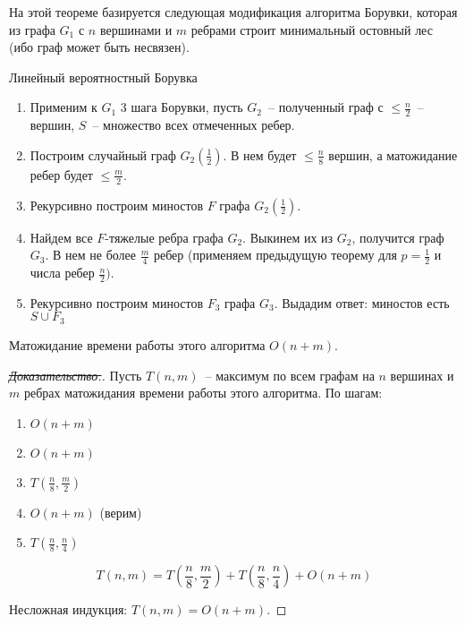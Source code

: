 На этой теореме базируется следующая модификация алгоритма Борувки, которая из графа $G_1$ с $n$ вершинами и $m$ ребрами строит минимальный остовный лес (ибо граф может быть несвязен).

\begin{algodescription}{Линейный вероятностный Борувка}
\begin{enumerate}
    \item Применим к $G_1$ 3 шага Борувки, пусть $G_2$~-- полученный граф с $\leq \frac{n}{2}$~-- вершин, $S$~-- множество всех отмеченных ребер.
    \item Построим случайный граф $G_2\left(\frac{1}{2}\right)$. В нем будет $\leq\frac{n}{8}$ вершин, а матожидание ребер будет $\leq\frac{m}{2}$.
    \item Рекурсивно построим миностов $F$ графа $G_2\left(\frac{1}{2}\right)$.
    \item Найдем все $F$-тяжелые ребра графа $G_2$. Выкинем их из $G_2$, получится граф $G_3$. В нем не более $\frac{m}{4}$ ребер (применяем предыдущую теорему для $p=\frac{1}{2}$ и числа ребер $\frac{n}{2})$.
    \item Рекурсивно построим миностов $F_3$ графа $G_3$. Выдадим ответ: миностов есть $S \cup F_3$
\end{enumerate}
\end{algodescription}

\begin{theorem*}
    Матожидание времени работы этого алгоритма $O(n+m)$.
\end{theorem*}
\begin{proof}[\sout{Доказательство.}]
    Пусть $T(n, m)$~-- максимум по всем графам на $n$ вершинах и $m$ ребрах матожидания времени работы этого алгоритма.
    По шагам:
    \begin{enumerate}
        \item $O(n+m)$
        \item $O(n+m)$
        \item $T\left(\frac{n}{8}, \frac{m}{2}\right)$
        \item $O(n+m)$ (верим)
        \item $T(\frac{n}{8}, \frac{n}{4})$
    \end{enumerate}

    $$T(n, m) = T\left(\frac{n}{8}, \frac{m}{2}\right) + T\left(\frac{n}{8}, \frac{n}{4}\right) + O(n+m)$$

    Несложная индукция: $T(n, m) = O(n+m)$.
\end{proof}
